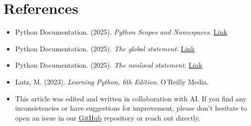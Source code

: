 \documentclass[12pt,letterpaper]{article}
\begin{document}
\section{References}

\begin{itemize}
    \item Python Documentation. (2025). \textit{Python Scopes and Namespaces}.
    \href{https://docs.python.org/3/tutorial/classes.html#python-scopes-and-namespaces}{Link}
    
    \item Python Documentation. (2025). \textit{The global statement}. 
    \href{https://docs.python.org/3/reference/simple_stmts.html#the-global-statement}{Link}
    
    \item Python Documentation. (2025). \textit{The nonlocal statement}. 
    \href{https://docs.python.org/3/reference/simple_stmts.html#the-nonlocal-statement}{Link}
    
    \item Lutz, M. (2023). \textit{Learning Python, 6th Edition}. O'Reilly Media.
    
    \item This article was edited and written in collaboration with AI. If you find any inconsistencies or have suggestions for improvement, please don't hesitate to open an issue in our \href{https://github.com/asanchezyali/social-media-posts}{GitHub} repository or reach out directly.
\end{itemize}
\end{document}
